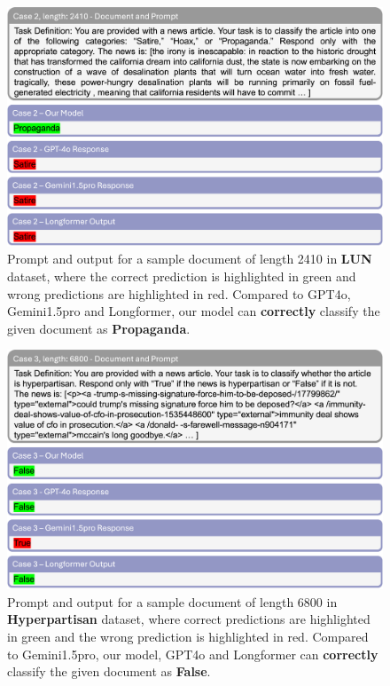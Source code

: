 \documentclass[11pt]{article}
\begin{document}
\begin{figure}[!h]
    \centering
    \includegraphics[width=1.0\linewidth]{images/case2.png}
    \caption{Prompt and output for a sample document of length 2410 in \textbf{LUN} dataset, where the correct prediction is highlighted in green and wrong predictions are highlighted in red. Compared to GPT4o, Gemini1.5pro and Longformer, our model can \textbf{correctly} classify the given document as \textbf{Propaganda}.}
    \label{fig:case2}
\end{figure}

\begin{figure}[!h]
    \vspace{-5pt}
    \centering
    \includegraphics[width=1.0\linewidth]{images/case3.png}
    \caption{Prompt and output for a sample document of length 6800 in \textbf{Hyperpartisan} dataset, where correct predictions are highlighted in green and the wrong prediction is highlighted in red. Compared to Gemini1.5pro, our model, GPT4o and Longformer can \textbf{correctly} classify the given document as \textbf{False}.}
    \label{fig:case3}
\end{figure}
\end{document}
